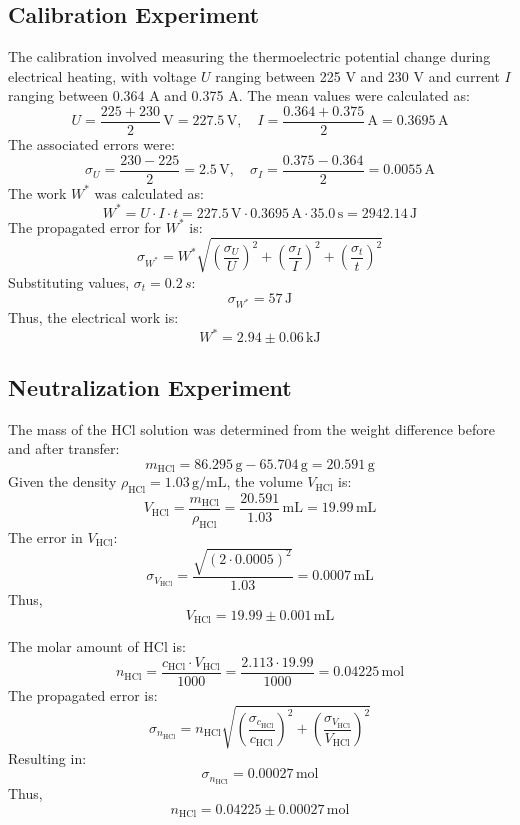 \documentclass[a4paper,12pt]{article}
\begin{document}
\subsection{Calibration Experiment}
The calibration involved measuring the thermoelectric potential change during electrical heating, with voltage \( U \) ranging between 225 V and 230 V and current \( I \) ranging between 0.364 A and 0.375 A. The mean values were calculated as:
\[
U = \frac{225 + 230}{2} \,\text{V} = 227.5 \, \text{V}, \quad I = \frac{0.364 + 0.375}{2} \,\text{A}= 0.3695 \, \text{A}
\]
The associated errors were:
\[
\sigma_U = \frac{230 - 225}{2} = 2.5 \, \text{V}, \quad \sigma_I = \frac{0.375 - 0.364}{2} = 0.0055 \, \text{A}
\]
The work \( W^* \) was calculated as:
\[
W^* = U \cdot I \cdot t = 227.5 \,\text{V}\cdot 0.3695 \,\text{A}\cdot 35.0 \,\text{s}= 2942.14 \, \text{J}
\]
The propagated error for \( W^* \) is:
\[
\sigma_{W^*} = W^* \sqrt{\left(\frac{\sigma_U}{U}\right)^2 + \left(\frac{\sigma_I}{I}\right)^2 + \left(\frac{\sigma_t}{t}\right)^2}
\]
Substituting values, \( \sigma_t = 0.2 \, s \):
\[
\sigma_{W^*} = 57 \, \text{J}
\]
Thus, the electrical work is:
\[
W^* = 2.94 \pm 0.06 \, \text{kJ}
\]

\subsection{Neutralization Experiment}
The mass of the HCl solution was determined from the weight difference before and after transfer:
\[
m_{\text{HCl}} = 86.295 \, \text{g} - 65.704 \, \text{g} = 20.591 \, \text{g}
\]
Given the density \( \rho_{\text{HCl}} = 1.03 \, \text{g/mL} \), the volume \( V_{\text{HCl}} \) is:
\[
V_{\text{HCl}} = \frac{m_{\text{HCl}}}{\rho_{\text{HCl}}} = \frac{20.591}{1.03} \,\text{mL}= 19.99 \, \text{mL}
\]
The error in \( V_{\text{HCl}} \):
\[
\sigma_{V_{\text{HCl}}} = \frac{\sqrt{(2 \cdot 0.0005)^2}}{1.03} = 0.0007 \, \text{mL}
\]
Thus,
\[
V_{\text{HCl}} = 19.99 \pm 0.001 \, \text{mL}
\]

The molar amount of HCl is:
\[
n_{\text{HCl}} = \frac{c_{\text{HCl}} \cdot V_{\text{HCl}}}{1000} = \frac{2.113 \cdot 19.99}{1000} = 0.04225 \, \text{mol}
\]
The propagated error is:
\[
\sigma_{n_{\text{HCl}}} = n_{\text{HCl}} \sqrt{\left(\frac{\sigma_{c_{\text{HCl}}}}{c_{\text{HCl}}}\right)^2 + \left(\frac{\sigma_{V_{\text{HCl}}}}{V_{\text{HCl}}}\right)^2}
\]
Resulting in:
\[
\sigma_{n_{\text{HCl}}} = 0.00027 \, \text{mol}
\]
Thus,
\[
n_{\text{HCl}} = 0.04225 \pm 0.00027 \, \text{mol}
\]
\end{document}
